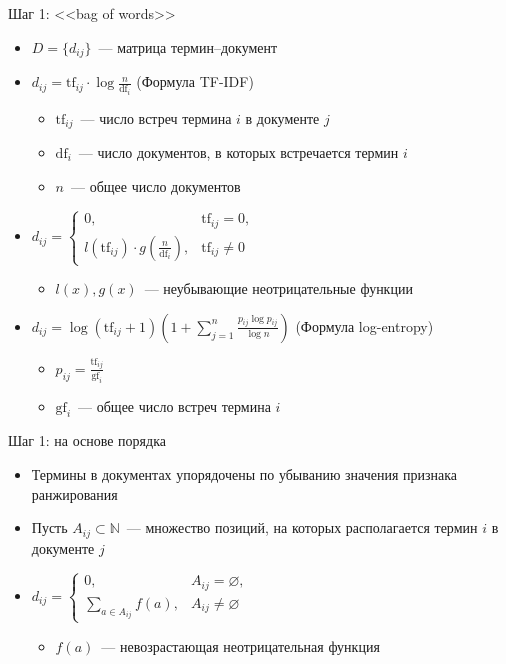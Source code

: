 \documentclass{beamer}
\begin{document}
\begin{frame}{Шаг 1: <<bag of words>>}
  \begin{itemize}
      \item {$D = \{d_{ij}\}$~--- матрица термин--документ}
      \item {$d_{ij} = \mathrm{tf}_{ij} \cdot \log{\frac{n}{\mathrm{df}_{i}}}$ (Формула TF-IDF)}
          \begin{itemize}
              \item $\mathrm{tf}_{ij}$~--- число встреч термина $i$ в документе $j$
              \item $\mathrm{df}_{i}$~--- число документов, в которых встречается термин $i$
              \item $n$~--- общее число документов
          \end{itemize}
      \item {$d_{ij} = \begin{cases}
          0,& \mathrm{tf}_{ij} = 0,\\
          l(\mathrm{tf}_{ij}) \cdot g(\frac{n}{\mathrm{df}_{i}}),& \mathrm{tf}_{ij} \ne 0
      \end{cases}$}
          \begin{itemize}
              \item {$l(x), g(x)$~--- неубывающие неотрицательные функции}
          \end{itemize}
      \item {$ 
             d_{ij} = \log{(\mathrm{tf}_{ij} + 1)} 
             (1 + \sum_{j=1}^{n} \frac{p_{ij} \log{p_{ij}}}{\log{n}})
             $ (Формула log-entropy)}
          \begin{itemize}
              \item {$p_{ij} = \frac{\mathrm{tf}_{ij}}{\mathrm{gf}_i}$}
              \item {$\mathrm{gf}_i$~--- общее число встреч термина $i$}
          \end{itemize}
  \end{itemize}
\end{frame}

\begin{frame}{Шаг 1: на основе порядка}
  \begin{itemize}
      \item {Термины в документах упорядочены по убыванию значения признака ранжирования}
      \item {Пусть $A_{ij} \subset \mathbb{N}$~--- множество позиций, на которых располагается
             термин $i$ в документе $j$}
      \item {$d_{ij} = \begin{cases}
          0,& A_{ij} = \varnothing,\\
          \sum\limits_{a \in A_{ij}}{f(a)},& A_{ij} \ne \varnothing 
      \end{cases}$}
      \begin{itemize}
          \item {$f(a)$~--- невозрастающая неотрицательная функция}
      \end{itemize}
  \end{itemize}
\end{frame}
\end{document}

